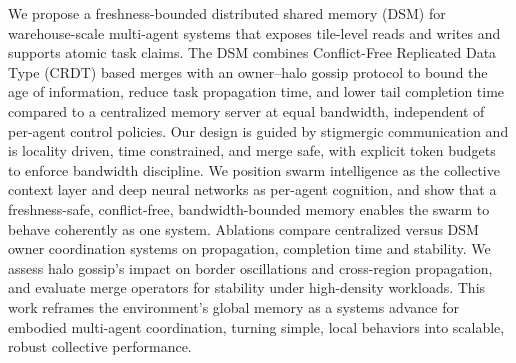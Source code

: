 We propose a freshness-bounded distributed shared memory (DSM) for warehouse-scale multi-agent systems that exposes tile-level reads and writes and supports atomic task claims. The DSM combines Conflict-Free Replicated Data Type (CRDT) based merges with an owner–halo gossip protocol to bound the age of information, reduce task propagation time, and lower tail completion time compared to a centralized memory server at equal bandwidth, independent of per-agent control policies. Our design is guided by stigmergic communication and is locality driven, time constrained, and merge safe, with explicit token budgets to enforce bandwidth discipline. We position swarm intelligence as the collective context layer and deep neural networks as per-agent cognition, and show that a freshness-safe, conflict-free, bandwidth-bounded memory enables the swarm to behave coherently as one system. Ablations compare centralized versus DSM owner coordination systems on propagation, completion time and stability. We assess halo gossip’s impact on border oscillations and cross-region propagation, and evaluate merge operators for stability under high-density workloads. This work reframes the environment’s global memory as a systems advance for embodied multi-agent coordination, turning simple, local behaviors into scalable, robust collective performance.
